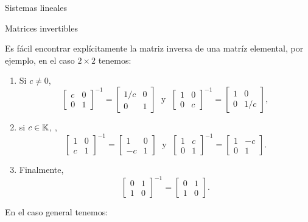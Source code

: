 \begin{chapter}{Sistemas lineales}
\begin{section}{Matrices invertibles}
            
            \begin{ejemplo*}
                Es fácil encontrar explícitamente la matriz inversa de una matríz elemental, por ejemplo, en el caso $2 \times 2$ tenemos:
                \begin{enumerate}
                    \item Si $c \not=0$,
                    \begin{equation*}
                    \begin{bmatrix} c& 0\\ 0&1\end{bmatrix}^{-1}=\begin{bmatrix} 1/c& 0\\ 0&1\end{bmatrix}
                    \;\text{ y }\; \begin{bmatrix} 1& 0\\ 0&c\end{bmatrix}^{-1}=\begin{bmatrix} 1& 0\\ 0&1/c\end{bmatrix},
                    \end{equation*}
                    \item si  $c \in \mathbb K$, ,
                    \begin{equation*}
                    \begin{bmatrix} 1& 0\\ c&1\end{bmatrix}^{-1}=\begin{bmatrix} 1& 0\\ -c&1\end{bmatrix}
                    \;\text{ y }\; \begin{bmatrix} 1& c\\ 0&1\end{bmatrix}^{-1}=\begin{bmatrix} 1& -c\\ 0&1\end{bmatrix}.
                    \end{equation*}
                    \item Finalmente, 
                    \begin{equation*}
                    \begin{bmatrix} 0& 1\\ 1&0\end{bmatrix} ^{-1}= 	\begin{bmatrix} 0& 1\\ 1&0\end{bmatrix}.
                    \end{equation*}
                \end{enumerate}
            En  el caso general tenemos:
            

\end{ejemplo*}
\end{section}
\end{chapter}
